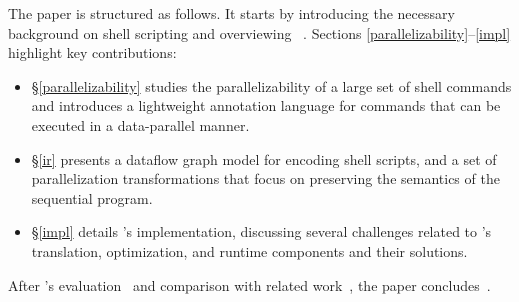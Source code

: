 \documentclass[letterpaper,twocolumn,10pt]{article}
\newcommand{\nv}[1]{[{\color{cyan}nv: #1}]}
\newcommand{\kk}[1]{[{\color{magenta}kk: #1}]}
\begin{document}
The paper is structured as follows.
It starts by introducing the necessary background on shell scripting and overviewing \sys~.
Sections \ref{parallelizability}--\ref{impl} highlight key contributions:
\begin{itemize}
  \item
  \S\ref{parallelizability}
    studies the parallelizability of a large set of shell commands and introduces a lightweight annotation language for commands that can be executed in a data-parallel manner.

  \item
  \S\ref{ir} presents a dataflow graph model for encoding shell scripts, and a set of parallelization transformations that focus on preserving the semantics of the sequential program.

  \item
  \S\ref{impl} details \sys's implementation, discussing several challenges related to \sys's translation, optimization, and runtime components and their solutions.

\end{itemize}

\noindent
After \sys's evaluation~ and  comparison with related work~, the paper concludes~.  


\end{document}
